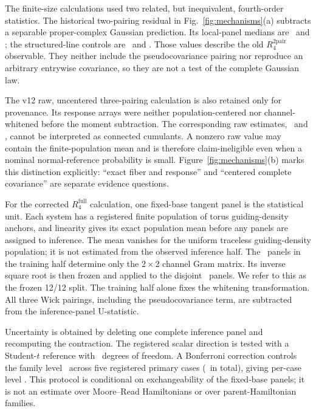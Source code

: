 The finite-size calculations used two related, but inequivalent, fourth-order
statistics.  The historical two-pairing residual in
Fig.~\ref{fig:mechanisms}(a) subtracts a separable proper-complex Gaussian
prediction.  Its local-panel medians are
\MooreReadNFourLocalTwoPairRFour\ and
\MooreReadNSixLocalTwoPairRFour; the structured-line controls are
\MooreReadNFourStructuredTwoPairRFour\ and
\MooreReadNSixStructuredTwoPairRFour.  Those values describe the old
$R_4^{2\mathrm{pair}}$ observable.  They neither include the
pseudocovariance pairing nor reproduce an arbitrary entrywise covariance, so
they are not a test of the complete Gaussian law.

The v12 raw, uncentered three-pairing calculation is also retained only for
provenance.  Its response arrays were neither population-centered nor
channel-whitened before the moment subtraction.  The corresponding raw
estimates, \MooreReadNFourRawMomentResidualEstimate\ and
\MooreReadNSixRawMomentResidualEstimate, cannot be interpreted as connected
cumulants.  A nonzero raw value may contain the finite-population mean and is
therefore claim-ineligible even when a nominal normal-reference probability
is small.  Figure~\ref{fig:mechanisms}(b) marks this distinction explicitly:
``exact fiber and response'' and ``centered complete covariance'' are
separate evidence questions.

For the corrected $R_4^{\mathrm{full}}$ calculation, one fixed-base tangent
panel is the statistical unit.  Each system has a registered finite
population of torus guiding-density anchors, and linearity gives its exact
population mean before any panels are assigned to inference.  The mean
vanishes for the uniform traceless guiding-density population; it is not
estimated from the observed inference half.  The \FullRFourTrainingCount\
panels in the training half determine only the $2\times2$ channel Gram
matrix.  Its inverse square root is then frozen and applied to the disjoint
\FullRFourInferenceCount\ panels.  We refer to this as the frozen 12/12
split.  The training half alone fixes the whitening transformation.  All
three Wick pairings, including the pseudocovariance term, are subtracted from
the inference-panel U-statistic.

Uncertainty is obtained by deleting one complete inference panel and
recomputing the contraction.  The registered scalar direction is tested with
a Student-$t$ reference with \FullRFourStudentTDegreesOfFreedom\ degrees of
freedom.  A Bonferroni correction controls the family level
\FullRFourFamilyAlpha\ across five registered primary cases
(\FullRFourPrimaryFamilySize\ in total), giving per-case level
\FullRFourPerCaseAlpha.  This protocol
is conditional on exchangeability of the fixed-base panels; it is not an
estimate over Moore--Read Hamiltonians or over parent-Hamiltonian families.

